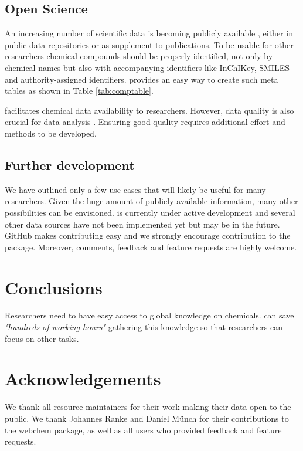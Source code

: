 \documentclass[article, shortnames]{jss}\usepackage[]{graphicx}\usepackage[]{color}
\begin{document}
\subsection[Open Science]{Open Science}
An increasing number of scientific data is becoming publicly available \citep{Gewin_2016, Reichman_Jones_Schildhauer_2011,Boyle_Guha_2011}, either in public data repositories or as supplement to publications.
To be usable for other researchers chemical compounds should be properly identified, not only by chemical names but also with accompanying identifiers like InChIKey, SMILES and authority-assigned identifiers.
 provides an easy way to create such meta tables as shown in Table \ref{tab:comptable}.

 facilitates chemical data availability to researchers.
However, data quality is also crucial for data analysis \citep{Stieger_2014}. 
Ensuring good quality requires additional effort and methods to be developed.


\subsection[Further development]{Further development}
We have outlined only a few use cases that will likely be useful for many researchers.
Given the huge amount of publicly available information, many other possibilities can be envisioned.
 is currently under active development and several other data sources have not been implemented yet but may be in the future.
GitHub makes contributing easy and we strongly encourage contribution to the package.
Moreover, comments, feedback and feature requests are highly welcome.


\section[Conclusions]{Conclusions}
Researchers need to have easy access to global knowledge on chemicals.
 can save \emph{"hundreds of working hours"} gathering this knowledge \citep{Munch_Galizia_2016} so that researchers can focus on other tasks.


\section*{Acknowledgements}
We thank all resource maintainers for their work making their data open to the public.
We thank Johannes Ranke and Daniel Münch for their contributions to the webchem package, as well as all users who provided feedback and feature requests.



\end{document}
